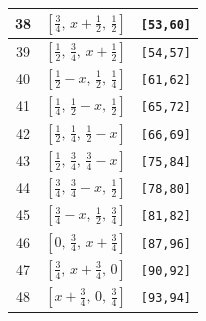 \documentclass[fleqn,8pt]{jsarticle}
\begin{document}
\begin{longtable}{ccc}
38 & $\left[ \frac{3}{4},\, x + \frac{1}{2},\, \frac{1}{2} \right]$ & {\tt [53,60]} \\ \hline
39 & $\left[ \frac{1}{2},\, \frac{3}{4},\, x + \frac{1}{2} \right]$ & {\tt [54,57]} \\ \hline
40 & $\left[ \frac{1}{2} - x,\, \frac{1}{2},\, \frac{1}{4} \right]$ & {\tt [61,62]} \\ \hline
41 & $\left[ \frac{1}{4},\, \frac{1}{2} - x,\, \frac{1}{2} \right]$ & {\tt [65,72]} \\ \hline
42 & $\left[ \frac{1}{2},\, \frac{1}{4},\, \frac{1}{2} - x \right]$ & {\tt [66,69]} \\ \hline
43 & $\left[ \frac{1}{2},\, \frac{3}{4},\, \frac{3}{4} - x \right]$ & {\tt [75,84]} \\ \hline
44 & $\left[ \frac{3}{4},\, \frac{3}{4} - x,\, \frac{1}{2} \right]$ & {\tt [78,80]} \\ \hline
45 & $\left[ \frac{3}{4} - x,\, \frac{1}{2},\, \frac{3}{4} \right]$ & {\tt [81,82]} \\ \hline
46 & $\left[ 0,\, \frac{3}{4},\, x + \frac{3}{4} \right]$ & {\tt [87,96]} \\ \hline
47 & $\left[ \frac{3}{4},\, x + \frac{3}{4},\, 0 \right]$ & {\tt [90,92]} \\ \hline
48 & $\left[ x + \frac{3}{4},\, 0,\, \frac{3}{4} \right]$ & {\tt [93,94]} \\
\end{longtable}
\renewcommand{\arraystretch}{1.2}
\end{document}
